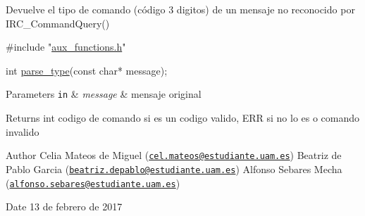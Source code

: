 Devuelve el tipo de comando (código 3 digitos) de un mensaje no reconocido por I\-R\-C\-\_\-\-Command\-Query()


\begin{DoxyCode}
\textcolor{preprocessor}{#include "\hyperlink{aux__functions_8h}{aux\_functions.h}"}

\textcolor{keywordtype}{int} \hyperlink{aux__functions_8h_a90798d5fe15fdd743f8802b0f154b854}{parse\_type}(\textcolor{keyword}{const} \textcolor{keywordtype}{char}* message);
\end{DoxyCode}



\begin{DoxyParams}[1]{Parameters}
\mbox{\tt in}  & {\em message} & mensaje original\\
\hline
\end{DoxyParams}
\begin{DoxyReturn}{Returns}
int codigo de comando si es un codigo valido, E\-R\-R si no lo es o comando invalido
\end{DoxyReturn}
\begin{DoxyAuthor}{Author}
Celia Mateos de Miguel (\href{mailto:cel.mateos@estudiante.uam.es}{\tt cel.\-mateos@estudiante.\-uam.\-es}) Beatriz de Pablo Garcia (\href{mailto:beatriz.depablo@estudiante.uam.es}{\tt beatriz.\-depablo@estudiante.\-uam.\-es}) Alfonso Sebares Mecha (\href{mailto:alfonso.sebares@estudiante.uam.es}{\tt alfonso.\-sebares@estudiante.\-uam.\-es})
\end{DoxyAuthor}
\begin{DoxyDate}{Date}
13 de febrero de 2017
\end{DoxyDate}


 